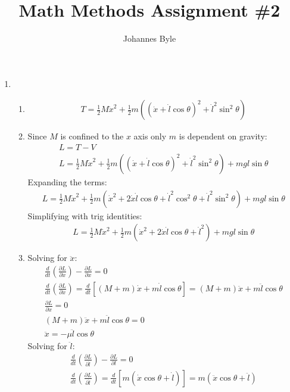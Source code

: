 \documentclass[12pt]{article}
\title{Math Methods Assignment \#2}
\author{Johannes Byle}
\newcommand{\p}[2]{\frac{\partial #1}{\partial #2}}
\newcommand{\der}[2]{\frac{d #1}{d #2}}
\begin{document}
  \maketitle
  \begin{enumerate}
    \item
    \begin{enumerate}
      \item
      \begin{gather}
        T=\frac{1}{2}M\dot{x}^2+\frac{1}{2}m((\dot{x}+\dot{l}\cos\theta)^2+\dot{l}^2\sin^2\theta)
      \end{gather}
      \item
      Since $M$ is confined to the $x$ axis only $m$ is dependent on gravity:
      \begin{gather}
        L=T-V\\
        L=\frac{1}{2}M\dot{x}^2+\frac{1}{2}m((\dot{x}+\dot{l}\cos\theta)^2+\dot{l}^2\sin^2\theta)+mgl\sin\theta
      \end{gather}
      Expanding the terms:
      \begin{gather}
        L=\frac{1}{2}M\dot{x}^2+\frac{1}{2}m(\dot{x}^2+2\dot{x}\dot{l}\cos\theta+\dot{l}^2\cos^2\theta+\dot{l}^2\sin^2\theta)+mgl\sin\theta
      \end{gather}
      Simplifying with trig identities:
      \begin{gather}
        L=\frac{1}{2}M\dot{x}^2+\frac{1}{2}m(\dot{x}^2+2\dot{x}\dot{l}\cos\theta+\dot{l}^2)+mgl\sin\theta
      \end{gather}
      \item
      Solving for $\ddot{x}$:
      \begin{gather}
        \der{}{t}\left(\p{L}{\dot{x}}\right)-\p{L}{x}=0\\
        \der{}{t}\left(\p{L}{\dot{x}}\right)=\der{}{t}\left[(M+m)\dot{x}+m\dot{l}\cos\theta\right]=(M+m)\ddot{x}+m\ddot{l}\cos\theta\\
        \p{L}{x}=0\\
        (M+m)\ddot{x}+m\ddot{l}\cos\theta=0\\
        \ddot{x}=-\mu\ddot{l}\cos\theta
      \end{gather}
      Solving for $\ddot{l}$:
      \begin{gather}
        \der{}{t}\left(\p{L}{\dot{l}}\right)-\p{L}{l}=0\\
        \der{}{t}\left(\p{L}{\dot{l}}\right)=\der{}{t}\left[m(\dot{x}\cos\theta+\dot{l})\right]=m(\ddot{x}\cos\theta+\ddot{l})\\

\end{gather}
\end{enumerate}
\end{enumerate}
\end{document}
